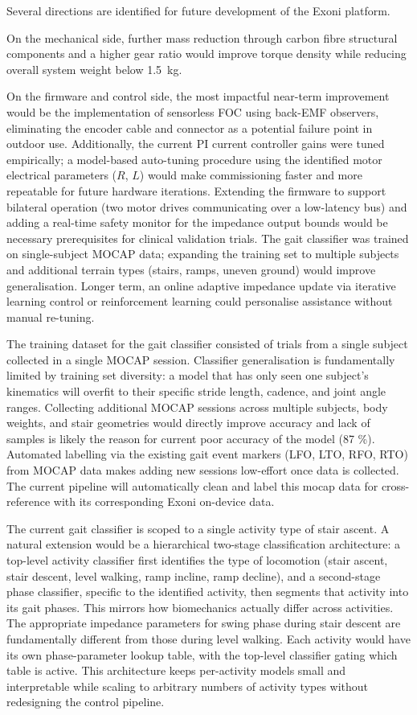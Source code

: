 \documentclass[11pt]{article}
\begin{document}
Several directions are identified for future development of the Exoni platform.

On the mechanical side, further mass reduction through carbon fibre structural components and a higher gear ratio would improve torque density while reducing overall system weight below 1.5~kg.

On the firmware and control side, the most impactful near-term improvement would be the implementation of sensorless FOC using back-EMF observers, eliminating the encoder cable and connector as a potential failure point in outdoor use. Additionally, the current PI current controller gains were tuned empirically; a model-based auto-tuning procedure using the identified motor electrical parameters ($R$, $L$) would make commissioning faster and more repeatable for future hardware iterations. Extending the firmware to support bilateral operation (two motor drives communicating over a low-latency bus) and adding a real-time safety monitor for the impedance output bounds would be necessary prerequisites for clinical validation trials. The gait classifier was trained on single-subject MOCAP data; expanding the training set to multiple subjects and additional terrain types (stairs, ramps, uneven ground) would improve generalisation. Longer term, an online adaptive impedance update via iterative learning control or reinforcement learning could personalise assistance without manual re-tuning.

The training dataset for the gait classifier consisted of trials from a single subject collected in a single MOCAP session.
Classifier generalisation is fundamentally limited by training set diversity: a model that has only seen one subject's kinematics will overfit to their specific stride length, cadence, and joint angle ranges.
Collecting additional MOCAP sessions across multiple subjects, body weights, and stair geometries would directly improve accuracy and lack of samples is likely the reason for current poor accuracy of the model (87 \%).
Automated labelling via the existing gait event markers (LFO, LTO, RFO, RTO) from MOCAP data makes adding new sessions low-effort once data is collected. The current pipeline will 
automatically clean and label this mocap data for cross-reference with its corresponding Exoni on-device data.

The current gait classifier is scoped to a single activity type of stair ascent. 
A natural extension would be a hierarchical two-stage classification architecture: a top-level activity classifier first identifies the type of locomotion (stair ascent, stair descent, level walking, ramp incline, ramp decline), and a second-stage phase classifier, specific to the identified activity, then segments that activity into its gait phases. 
This mirrors how biomechanics actually differ across activities. The appropriate impedance parameters for swing phase during stair descent are fundamentally different from those during level walking. 
Each activity would have its own phase-parameter lookup table, with the top-level classifier gating which table is active. 
This architecture keeps per-activity models small and interpretable while scaling to arbitrary numbers of activity types without redesigning the control pipeline.
\end{document}
